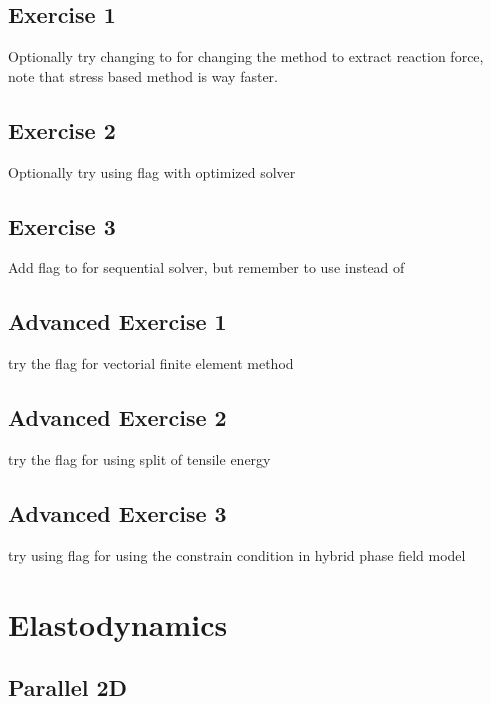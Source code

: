 \subsection{Exercise 1}

Optionally try changing  to  for changing the method to extract reaction force, note that stress based method is way faster.

\subsection{Exercise 2}

Optionally try using   flag with  optimized solver

\subsection{Exercise 3}

Add  flag to  for sequential solver, but remember to use  instead of 

\subsection{Advanced Exercise 1}
try the  flag for vectorial finite element method

\subsection{Advanced Exercise 2}
try the  flag for using split of tensile energy

\subsection{Advanced Exercise 3}
try using  flag for using the constrain condition in hybrid phase field model

\pagebreak

\section{Elastodynamics}

\subsection{Parallel 2D}

